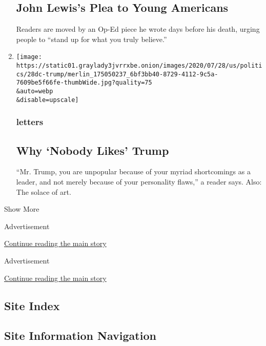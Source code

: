 \begin{enumerate}
  \hypertarget{john-lewiss-plea-to-young-americans}{%
  \subsection{John Lewis's Plea to Young
  Americans}\label{john-lewiss-plea-to-young-americans}}

  Readers are moved by an Op-Ed piece he wrote days before his death,
  urging people to ``stand up for what you truly believe.''
\item
  \href{/2020/07/30/opinion/letters/trump-personality.html}{}

  \texttt{[image: https://static01.graylady3jvrrxbe.onion/images/2020/07/28/us/politics/28dc-trump/merlin\_175050237\_6bf3bb40-8729-4112-9c5a-7609be5f66fe-thumbWide.jpg?quality=75\\\&auto=webp\\\&disable=upscale]}

  \hypertarget{letters-3}{%
  \subsubsection{letters}\label{letters-3}}

  \hypertarget{why-nobody-likes-trump}{%
  \subsection{Why `Nobody Likes' Trump}\label{why-nobody-likes-trump}}

  ``Mr. Trump, you are unpopular because of your myriad shortcomings as
  a leader, and not merely because of your personality flaws,'' a reader
  says. Also: The solace of art.
\end{enumerate}

Show More

Advertisement

\protect\hyperlink{after-mid2}{Continue reading the main story}

Advertisement

\protect\hyperlink{after-mktg}{Continue reading the main story}

\hypertarget{site-index}{%
\subsection{Site Index}\label{site-index}}

\hypertarget{site-information-navigation}{%
\subsection{Site Information
Navigation}\label{site-information-navigation}}

